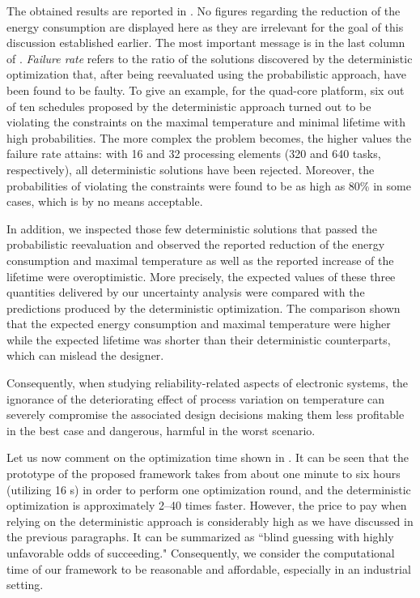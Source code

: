 The obtained results are reported in .
No figures regarding the reduction of the energy consumption are displayed here as they are irrelevant for the goal of this discussion established earlier.
The most important message is in the last column of .
\emph{Failure rate} refers to the ratio of the solutions discovered by the deterministic optimization that, after being reevaluated using the probabilistic approach, have been found to be faulty.
To give an example, for the quad-core platform, six out of ten schedules proposed by the deterministic approach turned out to be violating the constraints on the maximal temperature and minimal lifetime with high probabilities.
The more complex the problem becomes, the higher values the failure rate attains: with 16 and 32 processing elements (320 and 640 tasks, respectively), all deterministic solutions have been rejected.
Moreover, the probabilities of violating the constraints were found to be as high as 80\% in some cases, which is by no means acceptable.

In addition, we inspected those few deterministic solutions that passed the probabilistic reevaluation and observed the reported reduction of the energy consumption and maximal temperature as well as the reported increase of the lifetime were overoptimistic.
More precisely, the expected values of these three quantities delivered by our uncertainty analysis were compared with the predictions produced by the deterministic optimization.
The comparison shown that the expected energy consumption and maximal temperature were higher while the expected lifetime was shorter than their deterministic counterparts, which can mislead the designer.

Consequently, when studying reliability-related aspects of electronic systems, the ignorance of the deteriorating effect of process variation on temperature can severely compromise the associated design decisions making them less profitable in the best case and dangerous, harmful in the worst scenario.

Let us now comment on the optimization time shown in .
It can be seen that the prototype of the proposed framework takes from about one minute to six hours (utilizing 16 s) in order to perform one optimization round, and the deterministic optimization is approximately 2--40 times faster.
However, the price to pay when relying on the deterministic approach is considerably high as we have discussed in the previous paragraphs.
It can be summarized as ``blind guessing with highly unfavorable odds of succeeding."
Consequently, we consider the computational time of our framework to be reasonable and affordable, especially in an industrial setting.

